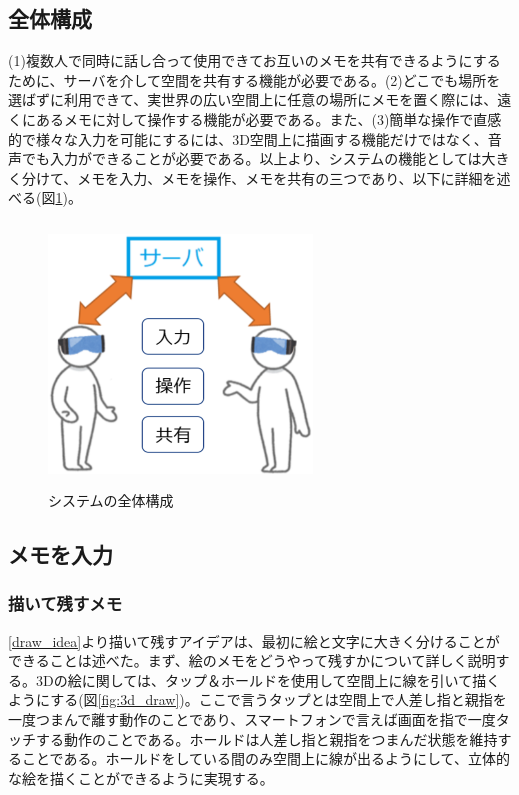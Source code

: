 \documentclass[11pt,a4j, titlepage]{jarticle} %
\begin{document}
\subsection{全体構成}
(1)複数人で同時に話し合って使用できてお互いのメモを共有できるようにするために、サーバを介して空間を共有する機能が必要である。(2)どこでも場所を選ばずに利用できて、実世界の広い空間上に任意の場所にメモを置く際には、遠くにあるメモに対して操作する機能が必要である。また、(3)簡単な操作で直感的で様々な入力を可能にするには、3D空間上に描画する機能だけではなく、音声でも入力ができることが必要である。以上より、システムの機能としては大きく分けて、メモを入力、メモを操作、メモを共有の三つであり、以下に詳細を述べる(図\ref{fig:systemzentai})。

\begin{figure}[H]
  \begin{center}
    \includegraphics[clip,height=7.0cm,width=7.0cm]{./systemzentai.eps}
    \caption{システムの全体構成}
    \label{fig:systemzentai}
  \end{center}
\end{figure}

\subsection{メモを入力}

\subsubsection{描いて残すメモ} \label{draw_memo}
\ref{draw_idea}より描いて残すアイデアは、最初に絵と文字に大きく分けることができることは述べた。まず、絵のメモをどうやって残すかについて詳しく説明する。3Dの絵に関しては、タップ＆ホールドを使用して空間上に線を引いて描くようにする(図\ref{fig:3d_draw})。ここで言うタップとは空間上で人差し指と親指を一度つまんで離す動作のことであり、スマートフォンで言えば画面を指で一度タッチする動作のことである。ホールドは人差し指と親指をつまんだ状態を維持することである。ホールドをしている間のみ空間上に線が出るようにして、立体的な絵を描くことができるように実現する。
\end{document}
